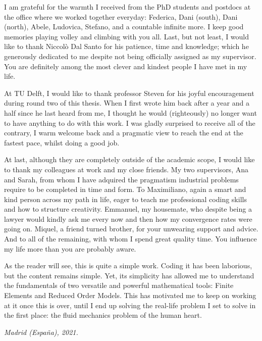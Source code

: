 \documentclass[thesis.tex]{subfiles}
\begin{document}
I am grateful for the warmth I received from the PhD students and postdocs at the office where we worked together everyday: Federica, Dani (south), Dani (north), Abele, Ludovica, Stefano, and a countable infinite more.
I keep good memories playing volley and climbing with you all.
Last, but not least, I would like to thank Niccolò Dal Santo for his patience, time and knowledge; which he generously dedicated to me despite not being officially assigned as my supervisor. 
You are definitely among the most clever and kindest people I have met in my life.

At TU Delft, I would like to thank professor Steven for his joyful encouragement during round two of this thesis.
When I first wrote him back after a year and a half since he last heard from me, I thought he would (righteously) no longer want to have anything to do with this work.
I was gladly surprised to receive all of the contrary, I warm welcome back and a pragmatic view to reach the end at the fastest pace, whilst doing a good job. 

At last, although they are completely outside of the academic scope, I would like to thank my colleagues at work and my close friends.
My two supervisors, Ana and Sarah, from whom I have adquired the pragmatism industrial problems require to be completed in time and form.
To Maximiliano, again a smart and kind person across my path in life, eager to teach me professional coding skills and how to structure creativity.
Emmanuel, my housemate, who despite being a lawyer would kindly ask me every now and then how my convergence rates were going on.
Miquel, a friend turned brother, for your unwearing support and advice.
And to all of the remaining, with whom I spend great quality time.
You influence my life more than you are probably aware.

As the reader will see, this is quite a simple work.
Coding it has been laborious, but the content remains simple.
Yet, its simplicity has allowed me to understand the fundamentals of two versatile and powerful mathematical tools: Finite Elements and Reduced Order Models.
This has motivated me to keep on working at it once this is over, until I end up solving the real-life problem I set to solve 
in the first place: the fluid mechanics problem of the human heart.

\begin{flushright}
    \vspace{5mm}
    \textit{Madrid (España), 2021.}    
\end{flushright}
\end{document}
